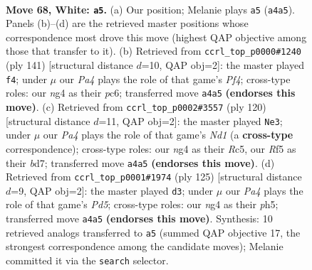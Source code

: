 \documentclass[11pt]{article}
\begin{document}
\clearpage

\begin{figure}[p]\centering
\begin{subfigure}{0.46\textwidth}\centering
\resizebox{\linewidth}{!}{%
\newchessgame
\chessboard[
  setfen={8/7k/1P6/5R2/P5n1/1K6/7r/8 w - - 9 68},
  showmover=false,
  pgfstyle=straightmove, color=movearrow, markmove={a4-a5}
]}
\caption{}
\end{subfigure}\hfill
\begin{subfigure}{0.46\textwidth}\centering
\resizebox{\linewidth}{!}{%
\newchessgame
\chessboard[
  setfen={8/K7/2P2k2/5p2/8/1r6/R7/8 b - - 5 71},
  showmover=false,
  pgfstyle=straightmove, color=movearrow, markmove={f5-f4}
]}
\caption{}
\end{subfigure}
\\[4pt]
\begin{subfigure}{0.46\textwidth}\centering
\resizebox{\linewidth}{!}{%
\newchessgame
\chessboard[
  setfen={8/3b4/r5k1/2R5/8/5PK1/8/3N4 w - - 13 61},
  showmover=false,
  pgfstyle=straightmove, color=movearrow, markmove={d1-e3}
]}
\caption{}
\end{subfigure}\hfill
\begin{subfigure}{0.46\textwidth}\centering
\resizebox{\linewidth}{!}{%
\newchessgame
\chessboard[
  setfen={5r2/8/6R1/7P/3pk3/8/6K1/8 b - - 2 63},
  showmover=false,
  pgfstyle=straightmove, color=movearrow, markmove={d4-d3}
]}
\caption{}
\end{subfigure}
\caption{\textbf{Move 68, White: \texttt{a5}.} (a) Our position; Melanie plays \texttt{a5} (\texttt{a4a5}). Panels (b)--(d) are the retrieved master positions whose correspondence most drove this move (highest QAP objective among those that transfer to it). (b) Retrieved from \texttt{ccrl\_top\_p0000\#1240} (ply 141) [structural distance $d$=10, QAP obj=2]: the master played \texttt{f4}; under $\mu$ our \emph{Pa4} plays the role of that game's \emph{Pf4}; cross-type roles: our \emph{n}g4 as their \emph{p}c6; transferred move \texttt{a4a5} \textbf{(endorses this move)}. (c) Retrieved from \texttt{ccrl\_top\_p0002\#3557} (ply 120) [structural distance $d$=11, QAP obj=2]: the master played \texttt{Ne3}; under $\mu$ our \emph{Pa4} plays the role of that game's \emph{Nd1} (a \textbf{cross-type} correspondence); cross-type roles: our \emph{n}g4 as their \emph{R}c5, our \emph{R}f5 as their \emph{b}d7; transferred move \texttt{a4a5} \textbf{(endorses this move)}. (d) Retrieved from \texttt{ccrl\_top\_p0001\#1974} (ply 125) [structural distance $d$=9, QAP obj=2]: the master played \texttt{d3}; under $\mu$ our \emph{Pa4} plays the role of that game's \emph{Pd5}; cross-type roles: our \emph{n}g4 as their \emph{p}h5; transferred move \texttt{a4a5} \textbf{(endorses this move)}. Synthesis: 10 retrieved analogs transferred to \texttt{a5} (summed QAP objective 17, the strongest correspondence among the candidate moves); Melanie committed it via the \texttt{search} selector.}
\label{fig:thought-m134}
\end{figure}
\end{document}
